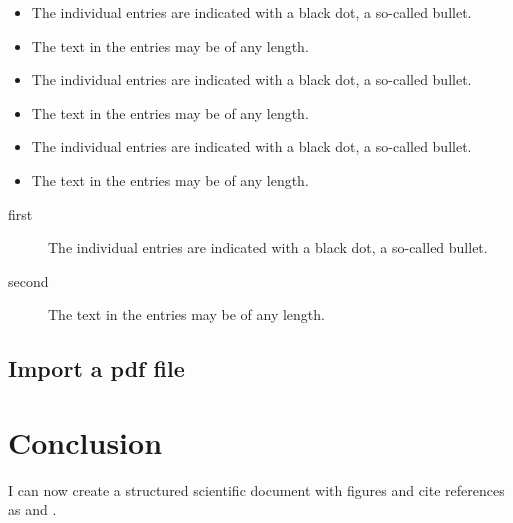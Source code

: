 \documentclass[hidelinks,11pt,a4paper]{report}
\begin{document}
\begin{itemize}[label=$\star$]
  \item The individual entries are indicated with a black dot, a so-called bullet.
  \item The text in the entries may be of any length.
\end{itemize}

\begin{itemize}[label=$\ast$]
  \item The individual entries are indicated with a black dot, a so-called bullet.
  \item The text in the entries may be of any length.
\end{itemize}

\begin{itemize}[label=$\rightarrow$]
  \item The individual entries are indicated with a black dot, a so-called bullet.
  \item The text in the entries may be of any length.
\end{itemize}

\begin{description}
  \item[first] The individual entries are indicated with a black dot, a so-called bullet.
  \item[second] The text in the entries may be of any length.
\end{description}



\section{Import a pdf file}




\chapter{Conclusion}

I can now create a structured scientific document
with figures and cite references as \cite{plmlatex_better_than_word} and \parencite{plmlatex_better_than_word}.

\newpage
\thispagestyle{empty}
\mbox{}
\newpage


\printbibliography[
    heading=bibintoc, %
    title={Bibliography} %
]
\end{document}
